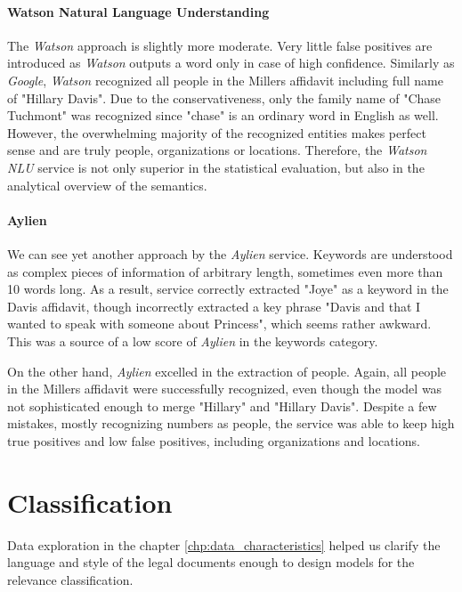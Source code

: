 \documentclass[
  digital, %
  notable,   %
  nolof,     %
  nolot,     %
]{fithesis3}
\begin{document}
\subsubsection{\textbf{Watson Natural Language Understanding}}
The \textit{Watson} approach is slightly more moderate.
Very little false positives are introduced as \textit{Watson} outputs a word only in case of high confidence.
Similarly as \textit{Google}, \textit{Watson} recognized all people in the Millers affidavit including full name of "Hillary Davis".
Due to the conservativeness, only the family name of "Chase Tuchmont" was recognized since "chase" is an ordinary word in English as well.
However, the overwhelming majority of the recognized entities makes perfect sense and are truly people, organizations or locations.
Therefore, the \textit{Watson NLU} service is not only superior in the statistical evaluation, but also in the analytical overview of the semantics.

\subsubsection{\textbf{Aylien}}
We can see yet another approach by the \textit{Aylien} service.
Keywords are understood as complex pieces of information of arbitrary length, sometimes even more than 10 words long.
As a result, service correctly extracted "Joye" as a keyword in the Davis affidavit, though incorrectly extracted a key phrase "Davis and that I wanted to speak with someone about Princess", which seems rather awkward.
This was a source of a low score of \textit{Aylien} in the keywords category.

On the other hand, \textit{Aylien} excelled in the extraction of people.
Again, all people in the Millers affidavit were successfully recognized, even though the model was not sophisticated enough to merge "Hillary" and "Hillary Davis".
Despite a few mistakes, mostly recognizing numbers as people, the service was able to keep high true positives and low false positives, including organizations and locations.


\chapter{Classification}
\label{chp:classification}
Data exploration in the chapter \ref{chp:data_characteristics} helped us clarify the language and style of the legal documents enough to design models for the relevance classification.
\end{document}
